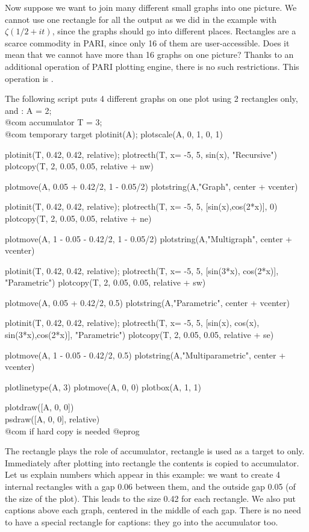 Now suppose we want to join many different small graphs into one picture.
We cannot use one rectangle for all the output as we did in the example
with $\zeta({1/2}+it)$, since the graphs should go into different places.
Rectangles are a scarce commodity in PARI, since only 16 of them are
user-accessible.  Does it mean that we cannot have more than 16 graphs on
one picture?  Thanks to an additional operation of PARI plotting engine,
there is no such restrictions.  This operation is .

The following script puts 4 different graphs on one plot using 2 rectangles
only,  and :
\bprog
  A = 2;   \\@com accumulator
  T = 3;   \\@com temporary target
  plotinit(A);         plotscale(A, 0, 1, 0, 1)

  plotinit(T, 0.42, 0.42, relative);
  plotrecth(T, x= -5, 5, sin(x), "Recursive")
  plotcopy(T, 2, 0.05, 0.05, relative + nw)

  plotmove(A, 0.05 + 0.42/2, 1 - 0.05/2)
  plotstring(A,"Graph", center + vcenter)

  plotinit(T, 0.42, 0.42, relative);
  plotrecth(T, x= -5, 5, [sin(x),cos(2*x)], 0)
  plotcopy(T, 2, 0.05, 0.05, relative + ne)

  plotmove(A, 1 - 0.05 - 0.42/2, 1 - 0.05/2)
  plotstring(A,"Multigraph", center + vcenter)

  plotinit(T, 0.42, 0.42, relative);
  plotrecth(T, x= -5, 5, [sin(3*x), cos(2*x)], "Parametric")
  plotcopy(T, 2, 0.05, 0.05, relative + sw)

  plotmove(A, 0.05 + 0.42/2, 0.5)
  plotstring(A,"Parametric", center + vcenter)

  plotinit(T, 0.42, 0.42, relative);
  plotrecth(T, x= -5, 5, [sin(x), cos(x), sin(3*x),cos(2*x)], "Parametric")
  plotcopy(T, 2, 0.05, 0.05, relative + se)

  plotmove(A, 1 - 0.05 - 0.42/2, 0.5)
  plotstring(A,"Multiparametric", center + vcenter)

  plotlinetype(A, 3)
  plotmove(A, 0, 0)
  plotbox(A, 1, 1)

  plotdraw([A, 0, 0])
  \\ psdraw([A, 0, 0], relative)          \\ @com if hard copy is needed
@eprog

The rectangle  plays the role of accumulator, rectangle  is
used as a target to  only.  Immediately after plotting into
rectangle  the contents is copied to accumulator.  Let us explain
numbers which appear in this example: we want to create 4 internal rectangles
with a gap 0.06 between them, and the outside gap 0.05 (of the size of the
plot).  This leads to the size 0.42 for each rectangle.  We also
put captions above each graph, centered in the middle of each gap.  There
is no need to have a special rectangle for captions: they go into the
accumulator too.

